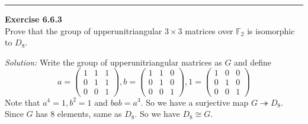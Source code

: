 \documentclass[a4paper, 12pt]{article}
\newenvironment{problem}[2][Exercise]
    { \begin{mdframed}[backgroundcolor=gray!20] \textbf{#1 #2} \\}
    {  \end{mdframed}}
\newenvironment{solution}
    {\textit{Solution:}}
    {}
\begin{document}
\noindent\rule{7in}{2.8pt}
\begin{problem}{6.6.3}
Prove that the group of upperunitriangular \(3\times 3\) matrices over \(\mathbb{F}_2\) is isomorphic to \(D_8\).
\end{problem}
\begin{solution}
Write the group of upperunitriangular matrices as \(G\) and define 
\[a=\begin{pmatrix}
    1 & 1& 1\\ 
    0 & 1& 1\\ 
    0 & 0& 1
\end{pmatrix}, b=\begin{pmatrix}
    1 & 1& 0\\ 
    0 & 1& 0\\ 
    0 & 0& 1
\end{pmatrix},1=\begin{pmatrix}
    1 & 0& 0\\ 
    0 & 1& 0\\ 
    0 & 0& 1
\end{pmatrix}\]
Note that \(a^4=1,b^2=1\) and \(bab=a^3\). So we have a surjective map \(G\twoheadrightarrow D_8\). Since \(G\) has \(8\) elements, same as \(D_8\). So we have 
\(D_8\cong G\).   
\end{solution}
\end{document}
